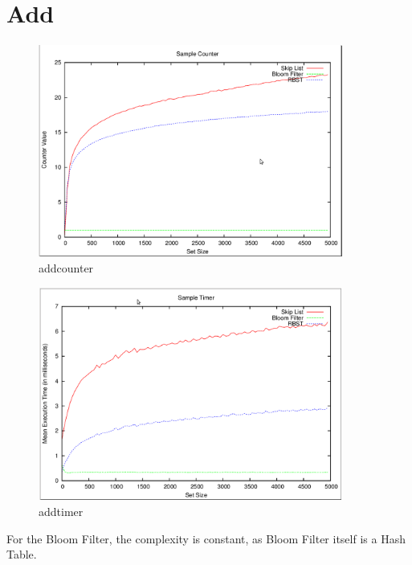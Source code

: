 \documentclass[11pt]{article}
\begin{document}
\section{Add}
\begin{figure}[ht]
\centering
\includegraphics[height=70mm,width=100mm]{addcounter.png}
\caption{addcounter}
\end{figure}
\begin{figure}[ht]
\centering
\includegraphics[height=70mm,width=100mm]{addtimer.png}
\caption{addtimer}
\end{figure}

For the Bloom Filter, the complexity is constant, as Bloom Filter itself is a Hash Table. 
\end{document}
